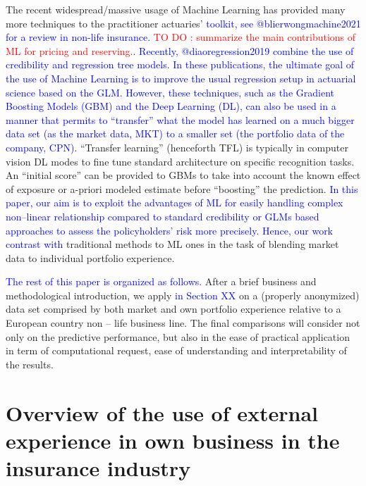 \documentclass[
]{article}
\begin{document}
The recent widespread/massive usage of Machine Learning has provided
many more techniques to the practitioner actuaries'
\textcolor{blue}{toolkit, see @blierwongmachine2021 for a review in non-life insurance}.
\textcolor{red}{TO DO : summarize the main contributions of ML for pricing and reserving.}.
\textcolor{blue}{Recently, @diaoregression2019 combine the use of credibility and regression tree models}.
\textcolor{blue}{In these publications, the ultimate goal of the use of Machine Learning is to improve the usual regression setup in actuarial science based on the GLM. However, these techniques, such as  the Gradient Boosting Models (GBM) and the Deep Learning (DL), can also be used in a manner that permits to “transfer” what the model has \textcolor{blue}{learned} on a much bigger data set (as the market data, MKT) to a smaller set (the portfolio data of the company, CPN).}
``Transfer learning'' (henceforth TFL) is typically in computer vision
DL modes to fine tune standard architecture on specific recognition
tasks. An ``initial score'' can be provided to GBMs to take into account
the known effect of exposure or a-priori modeled estimate before
``boosting'' the prediction.
\textcolor{blue}{In this paper, our aim is to exploit the advantages of ML for easily handling complex non–linear relationship compared to standard credibility or GLMs based approaches to assess the policyholders’ risk more precisely. Hence, our work contrast with}
traditional methods to ML ones in the task of blending market data to
individual portfolio experience.

\textcolor{blue}{The rest of this paper is organized as follows.} After
a brief business and methodological introduction, we apply
\textcolor{blue}{in Section XX} on a (properly anonymized) data set
comprised by both market and own portfolio experience relative to a
European country non -- life business line. The final comparisons will
consider not only on the predictive performance, but also in the ease of
practical application in term of computational request, ease of
understanding and interpretability of the results.

\hypertarget{overview-of-the-use-of-external-experience-in-own-business-in-the-insurance-industry}{%
\section{Overview of the use of external experience in own business in
the insurance
industry}\label{overview-of-the-use-of-external-experience-in-own-business-in-the-insurance-industry}}
\end{document}
